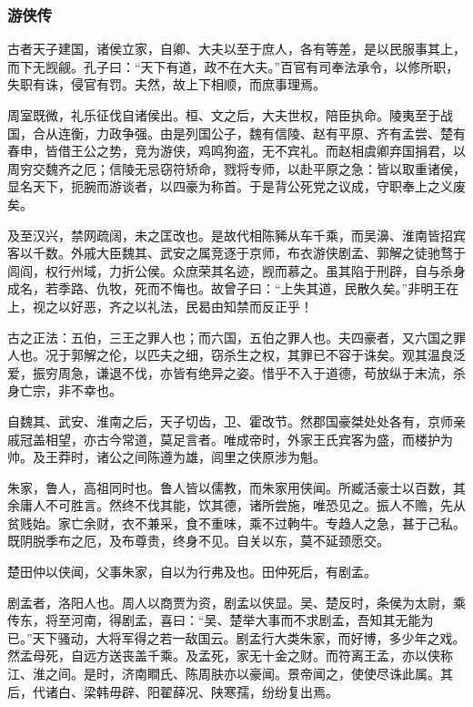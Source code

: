 \documentclass[]{article}
\begin{document}
\hypertarget{header-n6083}{%
\subsubsection{游侠传}\label{header-n6083}}

古者天子建国，诸侯立家，自卿、大夫以至于庶人，各有等差，是以民服事其上，而下无觊觎。孔子曰：``天下有道，政不在大夫。''百官有司奉法承令，以修所职，失职有诛，侵官有罚。夫然，故上下相顺，而庶事理焉。

周室既微，礼乐征伐自诸侯出。桓、文之后，大夫世权，陪臣执命。陵夷至于战国，合从连衡，力政争强。由是列国公子，魏有信陵、赵有平原、齐有孟尝、楚有春申，皆借王公之势，竞为游侠，鸡鸣狗盗，无不宾礼。而赵相虞卿弃国捐君，以周穷交魏齐之厄；信陵无忌窃符矫命，戮将专师，以赴平原之急：皆以取重诸侯，显名天下，扼腕而游谈者，以四豪为称首。于是背公死党之议成，守职奉上之义废矣。

及至汉兴，禁网疏阔，未之匡改也。是故代相陈豨从车千乘，而吴濞、淮南皆招宾客以千数。外戚大臣魏其、武安之属竞逐于京师，布衣游侠剧孟、郭解之徒驰骛于闾阎，权行州域，力折公侯。众庶荣其名迹，觊而慕之。虽其陷于刑辟，自与杀身成名，若季路、仇牧，死而不悔也。故曾子曰：``上失其道，民散久矣。''非明王在上，视之以好恶，齐之以礼法，民曷由知禁而反正乎！

古之正法：五伯，三王之罪人也；而六国，五伯之罪人也。夫四豪者，又六国之罪人也。况于郭解之伦，以匹夫之细，窃杀生之权，其罪已不容于诛矣。观其温良泛爱，振穷周急，谦退不伐，亦皆有绝异之姿。惜乎不入于道德，苟放纵于末流，杀身亡宗，非不幸也。

自魏其、武安、淮南之后，天子切齿，卫、霍改节。然郡国豪桀处处各有，京师亲戚冠盖相望，亦古今常道，莫足言者。唯成帝时，外家王氏宾客为盛，而楼护为帅。及王莽时，诸公之间陈遵为雄，闾里之侠原涉为魁。

朱家，鲁人，高祖同时也。鲁人皆以儒教，而朱家用侠闻。所臧活豪士以百数，其余庸人不可胜言。然终不伐其能，饮其德，诸所尝施，唯恐见之。振人不赡，先从贫贱始。家亡余财，衣不兼采，食不重味，乘不过軥牛。专趋人之急，甚于己私。既阴脱季布之厄，及布尊贵，终身不见。自关以东，莫不延颈愿交。

楚田仲以侠闻，父事朱家，自以为行弗及也。田仲死后，有剧孟。

剧孟者，洛阳人也。周人以商贾为资，剧孟以侠显。吴、楚反时，条侯为太尉，乘传东，将至河南，得剧孟，喜曰：``吴、楚举大事而不求剧孟，吾知其无能为已。''天下骚动，大将军得之若一敌国云。剧孟行大类朱家，而好博，多少年之戏。然孟母死，自远方送丧盖千乘。及孟死，家无十金之财。而符离王孟，亦以侠称江、淮之间。是时，济南瞷氏、陈周肤亦以豪闻。景帝闻之，使使尽诛此属。其后，代诸白、梁韩毋辟、阳翟薛况、陕寒孺，纷纷复出焉。
\end{document}

